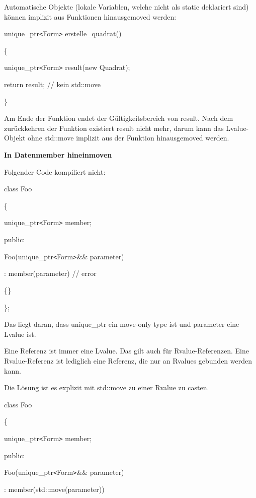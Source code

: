 \documentclass{article}
\begin{document}
Automatische Objekte (lokale Variablen, welche nicht als static deklariert sind) 
können implizit aus Funktionen hinausgemoved werden:

unique\_ptr\texttt{<}Form\texttt{>} erstelle\_quadrat()

\{    

\parindent=14pt
unique\_ptr\texttt{<}Form\texttt{>} result(new Quadrat);    

return result;   // kein std::move

\parindent=0pt
\}

Am Ende der Funktion endet der Gültigkeitsbereich von result. Nach dem zurückkehren 
der Funktion existiert result nicht mehr, darum kann das Lvalue-Objekt ohne std::move 
implizit aus der Funktion hinausgemoved werden.

\vspace{12pt}
\textbf{In Datenmember hineinmoven}

Folgender Code kompiliert nicht:

class Foo

\{    

\parindent=14pt
unique\_ptr\texttt{<}Form\texttt{>} member;

\vspace{12pt}
\parindent=0pt
public:    

\parindent=14pt
Foo(unique\_ptr\texttt{<}Form\texttt{>}\&\& parameter)    

: member(parameter)   // error    

\parindent=28pt
\{\}

\parindent=0pt
\};

Das liegt daran, dass unique\_ptr ein move-only type ist und parameter eine Lvalue 
ist.

Eine Referenz ist immer eine Lvalue. Das gilt auch für Rvalue-Referenzen. Eine 
Rvalue-Referenz ist lediglich eine Referenz, die nur an Rvalues gebunden werden 
kann.

Die Lösung ist es explizit mit std::move zu einer Rvalue zu casten.

class Foo

\{    

\parindent=14pt
unique\_ptr\texttt{<}Form\texttt{>} member;

\vspace{12pt}
\parindent=0pt
public:    

\parindent=14pt
Foo(unique\_ptr\texttt{<}Form\texttt{>}\&\& parameter)    

: member(std::move(parameter))    
\end{document}
